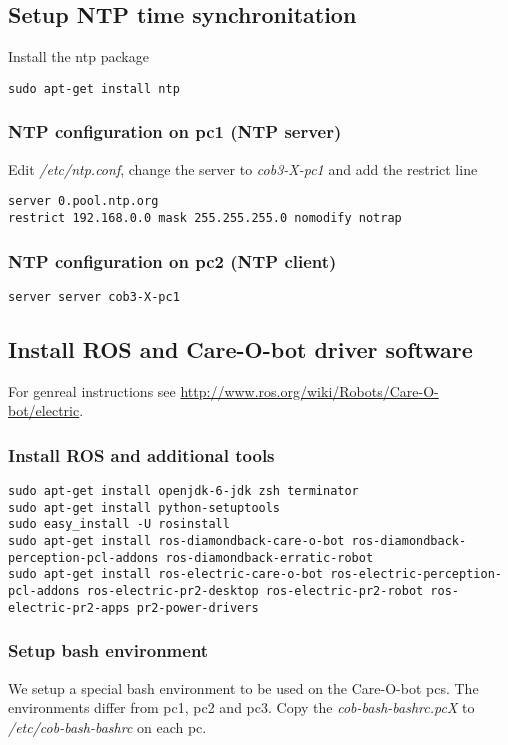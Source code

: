 \subsection{Setup NTP time synchronitation}
Install the ntp package

\begin{lstlisting}
sudo apt-get install ntp
\end{lstlisting}

\subsubsection{NTP configuration on pc1 (NTP server)}
Edit \textit{/etc/ntp.conf}, change the server to \textit{cob3-X-pc1} and add the restrict line

\begin{lstlisting} 
server 0.pool.ntp.org
restrict 192.168.0.0 mask 255.255.255.0 nomodify notrap
\end{lstlisting}

\subsubsection{NTP configuration on pc2 (NTP client)}

\begin{lstlisting}
server server cob3-X-pc1
\end{lstlisting}

\subsection{Install ROS and Care-O-bot driver software}
For genreal instructions see \url{http://www.ros.org/wiki/Robots/Care-O-bot/electric}.

\subsubsection{Install ROS and additional tools}
\begin{lstlisting}
sudo apt-get install openjdk-6-jdk zsh terminator
sudo apt-get install python-setuptools
sudo easy_install -U rosinstall
sudo apt-get install ros-diamondback-care-o-bot ros-diamondback-perception-pcl-addons ros-diamondback-erratic-robot
sudo apt-get install ros-electric-care-o-bot ros-electric-perception-pcl-addons ros-electric-pr2-desktop ros-electric-pr2-robot ros-electric-pr2-apps pr2-power-drivers
\end{lstlisting}

\subsubsection{Setup bash environment}
We setup a special bash environment to be used on the Care-O-bot pcs. The environments differ from pc1, pc2 and pc3. Copy the \textit{cob-bash-bashrc.pcX} to \textit{/etc/cob-bash-bashrc} on each pc.

